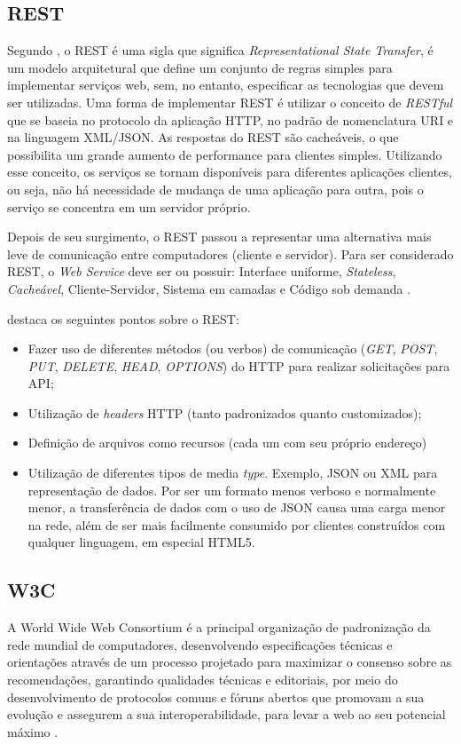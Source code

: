 \newpage
\subsection{REST}
Segundo , o REST é uma sigla que significa \textit{Representational State Transfer}, é um modelo arquitetural que define um conjunto de regras simples para implementar serviços web, sem, no entanto, especificar as tecnologias que devem ser utilizadas. Uma forma de implementar REST é utilizar o conceito de \textit{RESTful} que se baseia no protocolo da aplicação HTTP, no padrão de nomenclatura URI e na linguagem XML/JSON. As respostas do REST são cacheáveis, o que possibilita um grande aumento de performance para clientes simples. Utilizando esse conceito, os serviços se tornam disponíveis para diferentes aplicações clientes, ou seja, não há necessidade de mudança de uma aplicação para outra, pois o serviço se concentra em um servidor próprio. 

Depois de seu surgimento, o REST passou a representar uma alternativa mais leve de comunicação entre computadores (cliente e servidor). Para ser considerado REST, o \textit{Web Service} deve ser ou possuir: Interface uniforme, \textit{Stateless}, \textit{Cacheável}, Cliente-Servidor, Sistema em camadas e Código sob demanda \cite{rest:roy}. 

 destaca os seguintes pontos sobre o REST:
\begin{itemize}
    \item Fazer uso de diferentes métodos (ou verbos) de comunicação (\textit{GET}, \textit{POST}, \textit{PUT}, \textit{DELETE}, \textit{HEAD}, \textit{OPTIONS}) do HTTP para realizar solicitações para API; 
    \item Utilização de \textit{headers} HTTP (tanto padronizados quanto customizados); 
    \item Definição de arquivos como recursos (cada um com seu próprio endereço)
    \item Utilização de diferentes tipos de media \textit{type}. Exemplo, JSON ou XML para representação de dados. Por ser um formato menos verboso e normalmente menor, a transferência de dados com o uso de JSON causa uma carga menor na rede, além de ser mais facilmente consumido por clientes construídos com qualquer linguagem, em especial HTML5.
\end{itemize}

\subsection{W3C}
A World Wide Web Consortium é a principal organização de padronização da rede mundial de computadores, desenvolvendo especificações técnicas e orientações através de um processo projetado para maximizar o consenso sobre as recomendações, garantindo qualidades técnicas e editoriais, por meio do desenvolvimento de protocolos comuns e fóruns abertos que promovam a sua evolução e assegurem a sua interoperabilidade, para levar a web ao seu potencial máximo \cite{api:w3c}.

